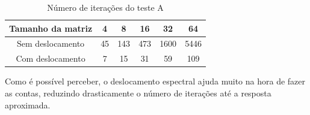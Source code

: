 \documentclass[12pt]{article} %
\begin{document}
        \begin{table}[h]
            \centering
            \begin{tabular}{|c | c c c c c|} 
                \hline
                Tamanho da matriz & 4 & 8 & 16 & 32 & 64\\
                \hline\hline
                Sem deslocamento & 45 & 143 & 473 & 1600 & 5446\\ 
                \hline
                Com deslocamento & 7 & 15 & 31 & 59 & 109 \\
                \hline
            \end{tabular}
            \caption{Número de iterações do teste A}
            \label{tab:iterA}
        \end{table}
        
        Como é possível perceber, o deslocamento espectral ajuda muito na hora de fazer as contas, reduzindo drasticamente o número de iterações até a resposta aproximada.
        
\end{document}

